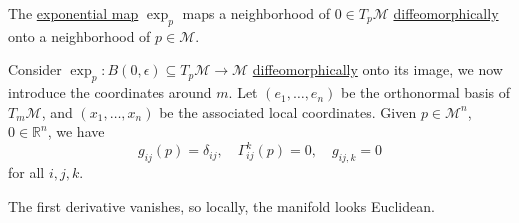 \begin{theorem}
	The \hyperref[def:exponential-map]{exponential map} \(\exp _p\) maps a neighborhood of \(0\in T_p \mathcal{M} \) \hyperref[def:diffeomorphic]{diffeomorphically} onto a neighborhood of \(p\in \mathcal{M} \).
\end{theorem}

Consider \(\exp _p\colon B(0, \epsilon ) \subseteq T_p \mathcal{M} \to  \mathcal{M} \) \hyperref[def:diffeomorphic]{diffeomorphically} onto its image, we now introduce the coordinates around \(m\). Let \((e_1, \ldots , e_n)\) be the orthonormal basis of \(T_m \mathcal{M} \), and \((x_1, \ldots , x_n)\) be the associated local coordinates. Given \(p\in \mathcal{M} ^n\), \(0\in \mathbb{R} ^n\), we have
\[
	g_{ij}(p) = \delta_{ij},\quad \Gamma _{ij}^k(p) = 0,\quad g_{ij, k} = 0
\]
for all \(i, j, k\).

\begin{definition}\label{def:normal-coordinate}

\end{definition}

\begin{note}
	The first derivative vanishes, so locally, the manifold looks Euclidean.
\end{note}

